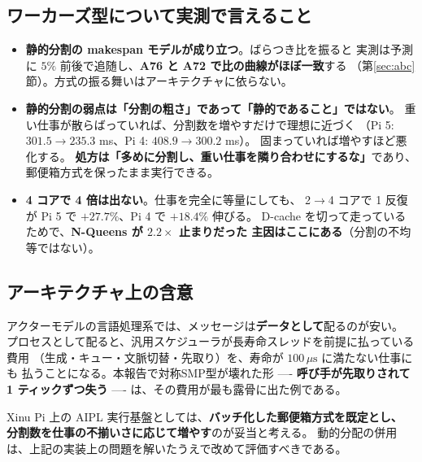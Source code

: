 \documentclass[a4paper,11pt]{ltjsarticle}
\begin{document}
\subsection{ワーカーズ型について実測で言えること}
\begin{itemize}
\item \textbf{静的分割の makespan モデルが成り立つ}。ばらつき比を振ると
      実測は予測に $5\%$ 前後で追随し、\textbf{A76 と A72 で比の曲線がほぼ一致}する
      （第\ref{sec:abc}節）。方式の振る舞いはアーキテクチャに依らない。
\item \textbf{静的分割の弱点は「分割の粗さ」であって「静的であること」ではない}。
      重い仕事が散らばっていれば、分割数を増やすだけで理想に近づく
      （Pi 5: $301.5 \to 235.3$ ms、Pi 4: $408.9 \to 300.2$ ms）。
      固まっていれば増やすほど悪化する。
      \textbf{処方は「多めに分割し、重い仕事を隣り合わせにするな」}であり、
      郵便箱方式を保ったまま実行できる。
\item \textbf{4 コアで 4 倍は出ない}。仕事を完全に等量にしても、
      2$\to$4 コアで 1 反復が Pi 5 で $+27.7\%$、Pi 4 で $+18.4\%$ 伸びる。
      D-cache を切って走っているためで、\textbf{N-Queens が $2.2\times$ 止まりだった
      主因はここにある}（分割の不均等ではない）。
\end{itemize}

\subsection{アーキテクチャ上の含意}
アクターモデルの言語処理系では、メッセージは\textbf{データとして}配るのが安い。
プロセスとして配ると、汎用スケジューラが長寿命スレッドを前提に払っている費用
（生成・キュー・文脈切替・先取り）を、寿命が $100\,\mu\mathrm{s}$ に満たない仕事にも
払うことになる。本報告で対称SMP型が壊れた形 ---- \textbf{呼び手が先取りされて
1 ティックずつ失う} ---- は、その費用が最も露骨に出た例である。

Xinu Pi 上の AIPL 実行基盤としては、\textbf{バッチ化した郵便箱方式を既定とし、
分割数を仕事の不揃いさに応じて増やす}のが妥当と考える。
動的分配の併用は、上記の実装上の問題を解いたうえで改めて評価すべきである。
\end{document}
